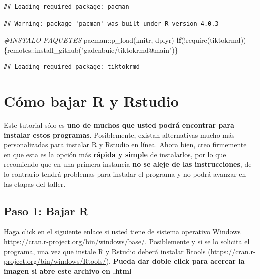\documentclass[
]{article}
\newenvironment{Shaded}{}{}
\newcommand{\CommentTok}[1]{\textcolor[rgb]{0.38,0.63,0.69}{\textit{#1}}}
\newcommand{\ControlFlowTok}[1]{\textcolor[rgb]{0.00,0.44,0.13}{\textbf{#1}}}
\newcommand{\FunctionTok}[1]{\textcolor[rgb]{0.02,0.16,0.49}{#1}}
\newcommand{\NormalTok}[1]{#1}
\newcommand{\SpecialCharTok}[1]{\textcolor[rgb]{0.25,0.44,0.63}{#1}}
\newcommand{\StringTok}[1]{\textcolor[rgb]{0.25,0.44,0.63}{#1}}
\begin{document}
\begin{verbatim}
## Loading required package: pacman
\end{verbatim}

\begin{verbatim}
## Warning: package 'pacman' was built under R version 4.0.3
\end{verbatim}

\begin{Shaded}
\begin{Highlighting}[]
\CommentTok{\#INSTALO PAQUETES}
\NormalTok{pacman}\SpecialCharTok{::}\FunctionTok{p\_load}\NormalTok{(knitr, dplyr)}
\ControlFlowTok{if}\NormalTok{(}\SpecialCharTok{!}\FunctionTok{require}\NormalTok{(tiktokrmd))\{remotes}\SpecialCharTok{::}\FunctionTok{install\_github}\NormalTok{(}\StringTok{"gadenbuie/tiktokrmd@main"}\NormalTok{)\}}
\end{Highlighting}
\end{Shaded}

\begin{verbatim}
## Loading required package: tiktokrmd
\end{verbatim}

\hypertarget{cuxf3mo-bajar-r-y-rstudio}{%
\section{Cómo bajar R y Rstudio}\label{cuxf3mo-bajar-r-y-rstudio}}

Este tutorial sólo es \textbf{uno de muchos que usted podrá encontrar
para instalar estos programas}. Posiblemente, existan alternativas mucho
más personalizadas para instalar R y Rstudio en línea. Ahora bien, creo
firmemente en que esta es la opción más \textbf{rápida y simple} de
instalarlos, por lo que recomiendo que en una primera instancia
\textbf{no se aleje de las instrucciones}, de lo contrario tendrá
problemas para instalar el programa y no podrá avanzar en las etapas del
taller.

\hypertarget{paso-1-bajar-r}{%
\subsection{Paso 1: Bajar R}\label{paso-1-bajar-r}}

Haga click en el siguiente enlace si usted tiene de sistema operativo
Windows \url{https://cran.r-project.org/bin/windows/base/}. Posiblemente
y si se lo solicita el programa, una vez que instale R y Rstudio deberá
instalar Rtools (\url{https://cran.r-project.org/bin/windows/Rtools/}).
\textbf{Pueda dar doble click para acercar la imagen si abre este
archivo en .html}
\end{document}
